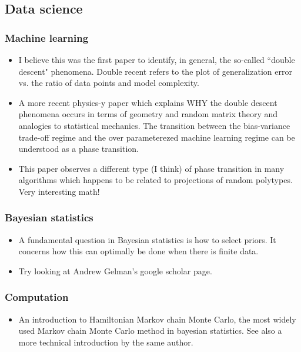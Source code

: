 \documentclass{amsart}
\begin{document}
\subsection{Data science}
\subsubsection{Machine learning}
\begin{itemize}
\item \cite{Belkin2019} I believe this was the first paper to identify, in general, the so-called ``double descent" phenomena. Double recent refers to the plot of generalization error vs. the ratio of data points and model complexity. 
\item \cite{?} A more recent physics-y paper which explains WHY the double descent phenomena occurs in terms of geometry and random matrix theory and analogies to statistical mechanics. The transition between the bias-variance trade-off regime and the over parameterezed machine learning regime can be understood as a phase transition. 
\item \cite{Donoho2009aa} This paper observes a different type (I think) of phase transition in many algorithms which happens to be related to projections of random polytypes. Very interesting math! 
\end{itemize}

\subsubsection{Bayesian statistics}
\begin{itemize}
\item \cite{Mattingly2018} A fundamental question in Bayesian statistics is how to select priors. It concerns how this can optimally be done when there is finite data. 
\item Try looking at Andrew Gelman's google scholar page. 
\end{itemize}


\subsubsection{Computation}

\begin{itemize}
\item \cite{Betancourt2017aa} An introduction to Hamiltonian Markov chain Monte Carlo, the most widely used Markov chain Monte Carlo method in bayesian statistics. See also a more technical introduction by the same author.
\end{itemize}
\end{document}
